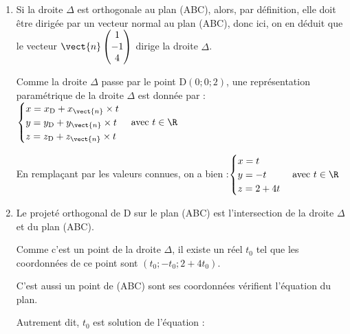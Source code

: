 \begin{enumerate}
\begin{enumerate}
		Comme A est un point de (ABC), on doit avoir :\quad $x_{\mathrm{A}} - y_{\mathrm{A}} + 4z_{\mathrm{A}} + d =0$.

		$\begin{aligned}
			x_{\mathrm{A}} - y_{\mathrm{A}} + 4z_{\mathrm{A}} + d =0
			&\iff 2 - 1 + 4\times 1 + d= 0\\
			&\iff 5 + d = 0\\
			&\iff d = -5
		\end{aligned}		$

		Une équation cartésienne de (ABC) est donc bien :\quad $x-y+4z - 5 = 0$.
	\end{enumerate}

	\item Si la droite $\Delta$ est orthogonale au plan (ABC), alors, par définition, elle doit être dirigée par un vecteur normal au plan (ABC), donc ici, on en déduit que le vecteur $\vect{n} \begin{pmatrix} 1\\-1\\4 \end{pmatrix}$ dirige la droite $\Delta$.

	Comme la droite $\Delta$ passe par le point D$(0 ; 0 ; 2)$, une représentation paramétrique de la droite $\Delta$ est donnée par :\quad $\begin{cases}
		x=x_{\mathrm{D}} + x_{\vect{n}}\times t\\
		y=y_{\mathrm{D}} + y_{\vect{n}}\times t\\
		z=z_{\mathrm{D}} + z_{\vect{n}}\times t
	\end{cases}\text{avec } t \in \R$

	En remplaçant par les valeurs connues, on a bien :\quad $\begin{cases}
		x=t\\
		y=-t\\
		z=2+4t
	\end{cases}\text{avec } t \in \R$

	\item Le projeté orthogonal de D sur le plan (ABC) est l'intersection de la droite $\Delta$ et du plan (ABC).

	Comme c'est un point de la droite $\Delta$, il existe un réel $t_0$ tel que les coordonnées de ce point sont $(t_0 ; -t_0 ; 2+4t_0)$.

	C'est aussi un point de (ABC) sont ses coordonnées vérifient l'équation du plan.

	Autrement dit, $t_0$ est solution de l'équation :


\end{enumerate}
